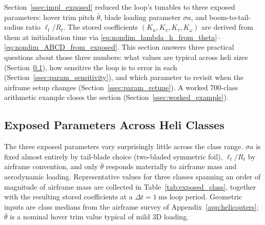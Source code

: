 \documentclass[11pt,a4paper]{article}
\newcommand{\Rt}{R_t}
\newcommand{\btheta}{\bar{\theta}}
\begin{document}
Section~\ref{ssec:impl_exposed} reduced the loop's tunables to three
exposed parameters: hover trim pitch \(\btheta\), blade loading
parameter \(\sigma a\), and boom-to-tail-radius ratio
\(\ell_t/\Rt\). The stored coefficients \((K_u,K_v,K_\tau,K_\omega)\) are derived
from them at initialisation time via
\eqref{eq:nondim_lambda_h_from_theta}--\eqref{eq:nondim_ABCD_from_exposed}.
This section answers three practical questions about those three
numbers: what values are typical across heli sizes
(Section~\ref{ssec:param_classes}), how sensitive the loop is to
error in each (Section~\ref{ssec:param_sensitivity}), and which
parameter to revisit when the airframe setup changes
(Section~\ref{ssec:param_retune}). A worked 700-class arithmetic
example closes the section (Section~\ref{ssec:worked_example}).

\subsection{Exposed Parameters Across Heli Classes}\label{ssec:param_classes}

The three exposed parameters vary surprisingly little across the
class range. \(\sigma a\) is fixed almost entirely by tail-blade
choice (two-bladed symmetric foil), \(\ell_t/\Rt\) by airframe
convention, and only \(\btheta\) responds materially to airframe
mass and aerodynamic loading. Representative values for three
classes spanning an order of magnitude of airframe mass are
collected in Table~\ref{tab:exposed_class}, together with the
resulting stored coefficients at a \(\Delta t=\SI{1}{\ms}\) loop
period. Geometric inputs are class medians from the airframe survey
of Appendix~\ref{app:helicopters}; \(\btheta\) is a nominal hover
trim value typical of mild 3D loading.
\end{document}

